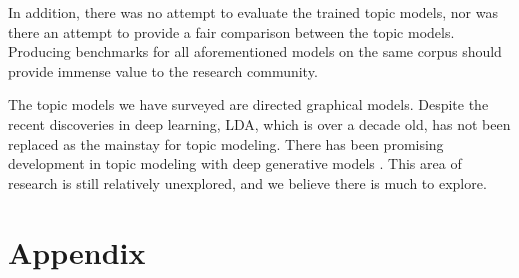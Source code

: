 \documentclass[letterpaper]{article}
\begin{document}
In addition, there was no attempt to evaluate the trained topic
models, nor was there an attempt to provide a fair comparison between
the topic models. Producing benchmarks for all aforementioned models
on the same corpus should provide immense value to the research
community.

The topic models we have surveyed are directed graphical models.
Despite the recent discoveries in deep learning, LDA, which is over a
decade old, has not been replaced as the mainstay for topic modeling.
There has been promising development in topic modeling with deep
generative models \cite{hinton2009replicated, larochelle2012neural,
  cao2015novel}. This area of research is still relatively unexplored,
and we believe there is much to explore.



\onecolumn

\section{Appendix}
\label{sec:appendix}
\end{document}
